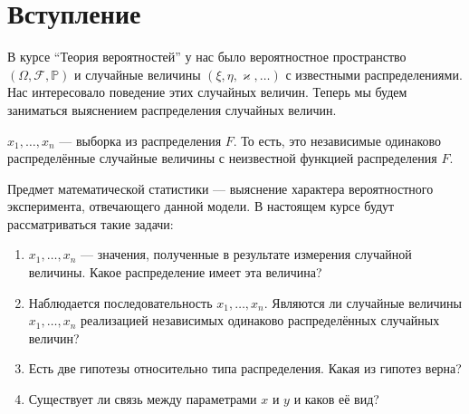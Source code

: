 \chapter*{Вступление}

В курсе ``Теория вероятностей'' у нас было вероятностное пространство
$\left( \Omega, \mathcal{F}, \mathbb{P} \right)$ и случайные величины
$\left( \xi, \eta, \varkappa, \dots \right)$ с известными распределениями.
Нас интересовало поведение этих случайных величин.
Теперь мы будем заниматься выяснением распределения случайных величин.

$x_1, \dots, x_n$ --- выборка из распределения $F$. То есть, это независимые
одинаково распределённые случайные величины с неизвестной функцией распределения
$F$.

Предмет математической статистики --- выяснение характера вероятностного
эксперимента, отвечающего данной модели.
В настоящем курсе будут рассматриваться такие задачи:
\begin{enumerate}
  \item
    $x_1, \dots, x_n$ --- значения, полученные в результате измерения случайной
    величины.
    Какое распределение имеет эта величина?
  \item
    Наблюдается последовательность $x_1, \dots, x_n$.
    Являются ли случайные величины $x_1, \dots, x_n$ реализацией независимых
    одинаково распределённых случайных величин?
  \item
    Есть две гипотезы относительно типа распределения.
    Какая из гипотез верна?
  \item
    Существует ли связь между параметрами $x$ и $y$ и каков её вид?
\end{enumerate}
